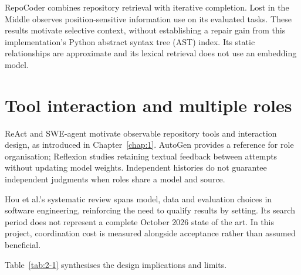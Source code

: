 RepoCoder combines repository retrieval with iterative completion. Lost in the Middle observes position-sensitive information use on its evaluated tasks. These results motivate selective context, without establishing a repair gain from this implementation's Python abstract syntax tree (AST) index. Its static relationships are approximate and its lexical retrieval does not use an embedding model. \citep{zhang2023repocoder, liu2024lostmiddle}

\section{Tool interaction and multiple roles}\label{sec:2.5}

ReAct and SWE-agent motivate observable repository tools and interaction design, as introduced in Chapter~\ref{chap:1}. AutoGen provides a reference for role organisation; Reflexion studies retaining textual feedback between attempts without updating model weights. Independent histories do not guarantee independent judgments when roles share a model and source. \citep{wu2024autogen, shinn2023reflexion}

Hou et al.'s systematic review spans model, data and evaluation choices in software engineering, reinforcing the need to qualify results by setting. Its search period does not represent a complete October 2026 state of the art. In this project, coordination cost is measured alongside acceptance rather than assumed beneficial. \citep{hou2024llmse}

Table~\ref{tab:2-1} synthesises the design implications and limits.

